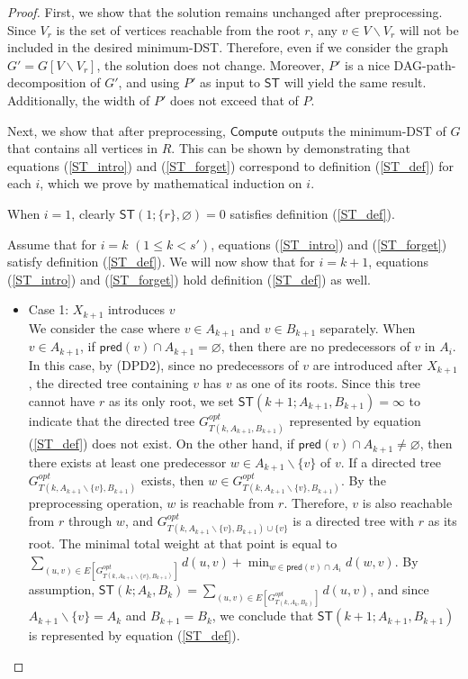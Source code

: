 \documentclass[runningheads]{llncs}
\theoremstyle{plain}
\theoremstyle{definition}
\begin{document}
\begin{proof}
    First, we show that the solution remains unchanged after preprocessing. Since $V_r$ is the set of vertices reachable from the root $r$, any $v \in V \backslash V_r$ will not be included in the desired minimum-DST. Therefore, even if we consider the graph $G' = G[V \backslash V_r]$, the solution does not change. Moreover, $P'$ is a nice DAG-path-decomposition of $G'$, and using $P'$ as input to $\mathsf{ST}$ will yield the same result. Additionally, the width of $P'$ does not exceed that of $P$.

    Next, we show that after preprocessing, $\mathsf{Compute}$ outputs the minimum-DST of $G$ that contains all vertices in $R$. This can be shown by demonstrating that equations (\ref{ST_intro}) and (\ref{ST_forget}) correspond to definition (\ref{ST_def}) for each $i$, which we prove by mathematical induction on $i$.
    
    When $i=1$, clearly $\mathsf{ST}(1; \{r\}, \varnothing) = 0$ satisfies definition (\ref{ST_def}).
    
    Assume that for $i=k$ $(1 \leq k < s')$, equations (\ref{ST_intro}) and (\ref{ST_forget}) satisfy definition (\ref{ST_def}). We will now show that for $i=k+1$, equations (\ref{ST_intro}) and (\ref{ST_forget}) hold definition (\ref{ST_def}) as well.

    \begin{itemize}
    \item Case 1: $X_{k+1}$ introduces $v$\\
    We consider the case where $v \in A_{k+1}$ and $v \in B_{k+1}$ separately. 
    When $v \in A_{k+1}$, if $\mathsf{pred}(v) \cap A_{k+1} = \varnothing$, then there are no predecessors of $v$ in $A_i$. In this case, by (DPD2), since no predecessors of $v$ are introduced after $X_{k+1}$, the directed tree containing $v$ has $v$ as one of its roots. Since this tree cannot have $r$ as its only root, we set $\mathsf{ST}(k+1; A_{k+1}, B_{k+1}) = \infty$ to indicate that the directed tree $G^{opt}_{T(k, A_{k+1}, B_{k+1})}$ represented by equation (\ref{ST_def}) does not exist. On the other hand, if $\mathsf{pred}(v) \cap A_{k+1} \neq \varnothing$, then there exists at least one predecessor $w \in A_{k+1} \backslash \{v\}$ of $v$. If a directed tree $G^{opt}_{T(k, A_{k+1} \backslash \{v\}, B_{k+1})}$ exists, then $w \in G^{opt}_{T(k, A_{k+1} \backslash \{v\}, B_{k+1})}$. By the preprocessing operation, $w$ is reachable from $r$. Therefore, $v$ is also reachable from $r$ through $w$, and $G^{opt}_{T(k, A_{k+1} \backslash \{v\}, B_{k+1}) \cup \{v\}}$ is a directed tree with $r$ as its root. The minimal total weight at that point is equal to $ \sum_{(u, v) \in E[G^{opt}_{T(k, A_{k+1} \backslash \{v\}, B_{k+1})}]} d(u, v) + \min_{w \in \mathsf{pred}(v) \cap A_i} d(w, v)$. By assumption, $\mathsf{ST}(k; A_k, B_k) = \sum_{(u, v) \in E[G^{opt}_{T(k, A_k, B_k)}]} d(u, v)$, and since $A_{k+1} \backslash \{v\} = A_k$ and $B_{k+1} = B_k$, we conclude that $\mathsf{ST}(k+1; A_{k+1}, B_{k+1})$ is represented by equation (\ref{ST_def}).


\end{itemize}
\end{proof}
\end{document}
